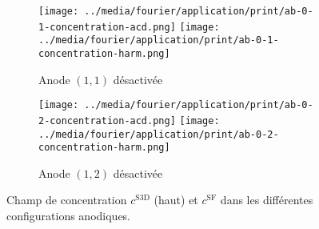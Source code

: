 \begin{figure}[h!]
  \begin{center}
    \begin{subfigure}[t]{\textwidth}
      \begin{center}
        \texttt{[image: ../media/fourier/application/print/ab-0-1-concentration-acd.png]}
        \texttt{[image: ../media/fourier/application/print/ab-0-1-concentration-harm.png]}
        \caption{Anode $(1,1)$ désactivée}
        \label{fig:}
      \end{center}
    \end{subfigure}

    \begin{subfigure}[t]{\textwidth}
      \begin{center}
        \texttt{[image: ../media/fourier/application/print/ab-0-2-concentration-acd.png]}
        \texttt{[image: ../media/fourier/application/print/ab-0-2-concentration-harm.png]}
        \caption{Anode $(1,2)$ désactivée}
        \label{fig:}
      \end{center}
    \end{subfigure}


    \caption{Champ de concentration $c^\mathrm{S3D}$ (haut) et
      $c^\mathrm{SF}$ dans les différentes configurations anodiques.}

    \label{fig:harmonic-concentration-comp-a}
  \end{center}
\end{figure}

